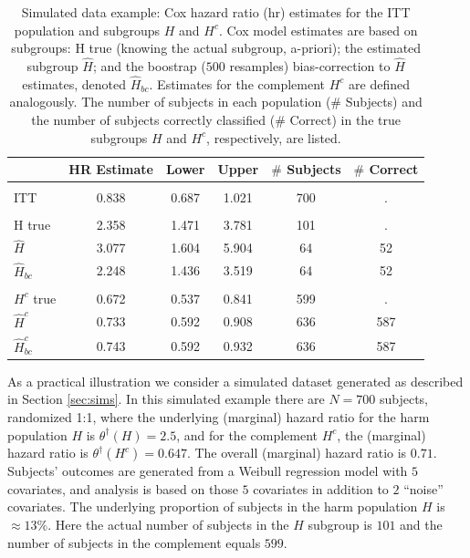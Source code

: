 \documentclass[oupdraft]{bio}
\def\hplim{\theta^{\dagger}(H)}
\def\hcplim{\theta^{\dagger}(H^{c})}
\begin{document}
\begin{table}[p]
\caption{\label{tab:simex1} Simulated data example: Cox hazard ratio (hr) estimates for the ITT population and subgroups $H$ and $H^{c}$.
Cox model estimates are based on subgroups: H true (knowing the actual subgroup, a-priori); the estimated subgroup $\hat{H}$; and 
the boostrap ($500$ resamples) bias-correction to $\hat{H}$ estimates, denoted $\hat{H}_{bc}$.  Estimates for the complement $H^{c}$ are defined analogously.
The number of subjects in each population ($\#$ Subjects) and the number of subjects correctly classified ($\#$ Correct) in the true subgroups $H$ and $H^{c}$, respectively, are listed.}
\centering
\fontsize{9}{11}\selectfont
\begin{tabular}[t]{lccccc}
\toprule
  & HR Estimate & Lower & Upper & $\#$ Subjects & $\#$ Correct\\
\midrule
\addlinespace[0.3em]
\multicolumn{6}{l}{\textbf{ITT}}\\
\hspace{1em}ITT & 0.838 & 0.687 & 1.021 & 700 & .\\
\addlinespace[0.3em]
\multicolumn{6}{l}{\textbf{H subgroup estimates}}\\
\hspace{1em}H true & 2.358 & 1.471 & 3.781 & 101 & .\\
\hspace{1em}$\hat{H}$ & 3.077 & 1.604 & 5.904 & 64 & 52\\
\hspace{1em}$\hat{H}_{bc}$ & 2.248 & 1.436 & 3.519 & 64 & 52\\
\addlinespace[0.3em]
\multicolumn{6}{l}{\textbf{H-complement subgroup estimates}}\\
\hspace{1em}$H^{c}$ true & 0.672 & 0.537 & 0.841 & 599 & .\\
\hspace{1em}$\hat{H}^{c}$ & 0.733 & 0.592 & 0.908 & 636 & 587\\
\hspace{1em}$\hat{H}^{c}_{bc}$ & 0.743 & 0.592 & 0.932 & 636 & 587\\
\bottomrule
\end{tabular}
\end{table}



As a practical illustration we consider a simulated dataset generated as described in Section \ref{sec:sims}.   In this simulated example there are 
$N=700$ subjects, randomized 1:1, where the underlying (marginal) hazard ratio for the harm population $H$ is 
$\hplim =2.5$, and for the complement $H^{c}$, the (marginal) hazard ratio is $\hcplim =0.647$.  The overall (marginal) hazard ratio is $0.71$.  
Subjects' outcomes are generated from a Weibull regression model with $5$ covariates, and analysis is based on those $5$ covariates in addition to $2$ ``noise'' covariates.
The underlying proportion of subjects in the harm population $H$ is $\approx 13\%$.  Here the actual number of subjects in the $H$ subgroup is $101$ and the number of subjects in the complement equals $599$.  
\end{document}
